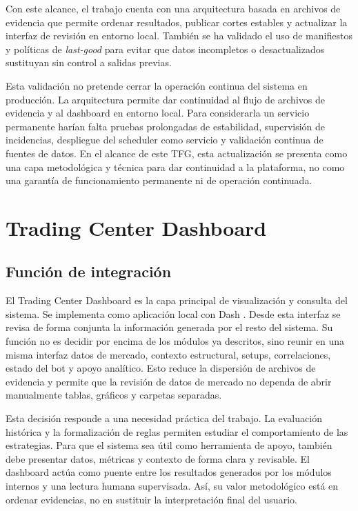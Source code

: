 Con este alcance, el trabajo cuenta con una arquitectura basada en archivos de evidencia
que permite ordenar resultados, publicar cortes estables y actualizar la
interfaz de revisi\'on en entorno local. Tambi\'en se ha validado el uso de
manifiestos y pol\'iticas de \textit{last-good} para evitar que datos incompletos
o desactualizados sustituyan sin control a salidas previas.

Esta validaci\'on no pretende cerrar la operaci\'on continua del sistema en
producci\'on. La arquitectura permite dar continuidad al flujo de archivos de evidencia y al
dashboard en entorno local. Para considerarla un servicio permanente har\'ian
falta pruebas prolongadas de estabilidad, supervisi\'on de incidencias,
despliegue del scheduler como servicio y validaci\'on continua de fuentes de
datos. En el alcance de este TFG, esta actualizaci\'on se presenta como una capa
metodol\'ogica y t\'ecnica para dar continuidad a la plataforma, no como una
garant\'ia de funcionamiento permanente ni de operaci\'on continuada.

\section{Trading Center Dashboard}
\label{sec:trading-center-dashboard}

\subsection{Funci\'on de integraci\'on}
\label{subsec:dashboard-funcion-integracion}

El Trading Center Dashboard es la capa principal de visualizaci\'on y consulta
del sistema. Se implementa como aplicaci\'on local con Dash \cite{dash_docs}.
Desde esta interfaz se revisa de forma conjunta la informaci\'on generada por el
resto del sistema. Su funci\'on no es decidir por encima de los m\'odulos ya
descritos, sino reunir en una misma interfaz datos de mercado, contexto
estructural, setups, correlaciones, estado del bot y apoyo anal\'itico. Esto
reduce la dispersi\'on de archivos de evidencia y permite que la revisi\'on de
datos de mercado no dependa de abrir manualmente tablas, gr\'aficos y carpetas
separadas.

Esta decisi\'on responde a una necesidad pr\'actica del trabajo. La evaluaci\'on
hist\'orica y la formalizaci\'on de reglas permiten estudiar el comportamiento de
las estrategias. Para que el sistema sea \'util como herramienta de apoyo,
tambi\'en debe presentar datos, m\'etricas y contexto de forma clara y revisable. El dashboard
act\'ua como puente entre los resultados generados por los m\'odulos internos y
una lectura humana supervisada. As\'i, su valor metodol\'ogico est\'a en
ordenar evidencias, no en sustituir la interpretaci\'on final del usuario.


